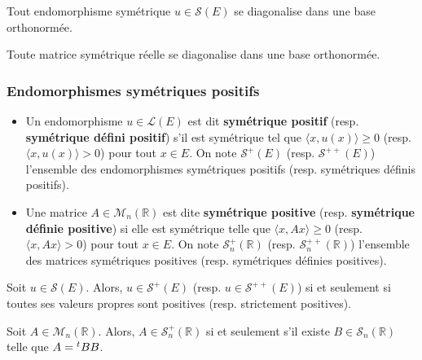   \begin{theorem}
    Tout endomorphisme symétrique $u \in \mathcal{S}(E)$ se diagonalise dans une base orthonormée.
  \end{theorem}

  \begin{corollary}
    Toute matrice symétrique réelle se diagonalise dans une base orthonormée.
  \end{corollary}

  \subsubsection{Endomorphismes symétriques positifs}

  \begin{definition}
    \begin{itemize}
      \item Un endomorphisme $u \in \mathcal{L}(E)$ est dit \textbf{symétrique positif} (resp. \textbf{symétrique défini positif}) s'il est symétrique tel que $\langle x, u(x) \rangle \geq 0$ (resp. $\langle x, u(x) \rangle > 0$) pour tout $x \in E$. On note $\mathcal{S}^+(E)$ (resp. $\mathcal{S}^{++}(E)$) l'ensemble des endomorphismes symétriques positifs (resp. symétriques définis positifs).
      \item Une matrice $A \in \mathcal{M}_n(\mathbb{R})$ est dite \textbf{symétrique positive} (resp. \textbf{symétrique définie positive}) si elle est symétrique telle que $\langle x, Ax \rangle \geq 0$ (resp. $\langle x, Ax \rangle > 0$) pour tout $x \in E$. On note $\mathcal{S}_n^+(\mathbb{R})$ (resp. $\mathcal{S}_n^{++}(\mathbb{R})$) l'ensemble des matrices symétriques positives (resp. symétriques définies positives).
    \end{itemize}
  \end{definition}

  \begin{theorem}
    Soit $u \in \mathcal{S}(E)$. Alors, $u \in \mathcal{S}^+(E)$ (resp. $u \in \mathcal{S}^{++}(E)$) si et seulement si toutes ses valeurs propres sont positives (resp. strictement positives).
  \end{theorem}

  \begin{corollary}
    Soit $A \in \mathcal{M}_n(\mathbb{R})$. Alors, $A \in \mathcal{S}^+_n(\mathbb{R})$ si et seulement s'il existe $B \in \mathcal{S}_n(\mathbb{R})$ telle que $A = \mathstrut ^t BB$.
  \end{corollary}

